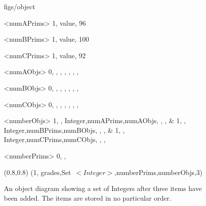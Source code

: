 





\begin {figure}


\Draw

 {figs/object}

\Indirect \Table <numAPrims>
{  1, value, 96 }

\Indirect \Table <numBPrims>
{  1, value, 100 }

\Indirect \Table <numCPrims>
{  1, value, 92 }

\Indirect \Table <numAObjs>
{  0, , , , , , ,  }

\Indirect \Table <numBObjs>
{  0, , , , , , ,  }

\Indirect \Table <numCObjs>
{  0, , , , , , ,   }

\Indirect \Table <numberObjs>
 {  
    1, , Integer,numAPrims,numAObjs, , , &
    1, , Integer,numBPrims,numBObjs, , , &
    1, , Integer,numCPrims,numCObjs, , , 
}
  
\Indirect \Table <numberPrims>
 {  0, , }


\Scale (0.8,0.8)
\ObjSet(1, grades,Set~$<Integer>$,numberPrims,numberObjs,3)
    
\EndDraw

\caption {An object diagram showing a set of Integers after three
items have been added. The items are stored in no particular order.} 

\label {fig:set}

\end {figure}


